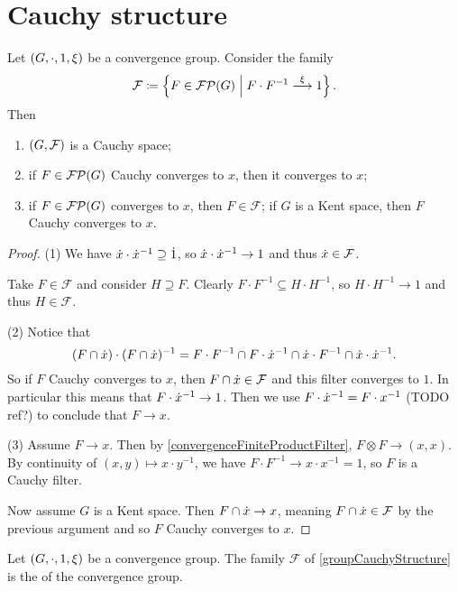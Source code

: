 \section{Cauchy structure}
\begin{proposition} \label{groupCauchyStructure}
Let $\left( G, \cdot, 1, \xi \right)$ be a convergence group. Consider the family
\[ \mathcal{F} \coloneqq \left\{ F\in \operatorname{\mathcal{FP}}(G) \;\middle|\; F\cdot F^{-1} \overset{\xi}{\longrightarrow} 1 \right\}. \]
Then
\begin{enumerate}
\item $\left( G, \mathcal{F} \right)$ is a Cauchy space;
\item if $F\in \operatorname{\mathcal{FP}}(G)$ Cauchy converges to $x$, then it converges to $x$;
\item if $F\in \operatorname{\mathcal{FP}}(G)$ converges to $x$, then $F\in \mathcal{F}$; if $G$ is a Kent space, then $F$ Cauchy converges to $x$.
\end{enumerate}
\end{proposition}
\begin{proof}
(1) We have $\dot{x}\cdot \dot{x}^{-1} \supseteq \dot{1}$, so $\dot{x}\cdot \dot{x}^{-1} \to 1$ and thus $\dot{x} \in \mathcal{F}$.

Take $F\in \mathcal{F}$ and consider $H\supseteq F$. Clearly $F\cdot F^{-1} \subseteq H\cdot H^{-1}$, so $H\cdot H^{-1} \to 1$ and thus $H\in \mathcal{F}$.

(2) Notice that
\[ (F\cap \dot{x})\cdot(F\cap \dot{x})^{-1} = F\cdot F^{-1} \cap F\cdot \dot{x}^{-1} \cap \dot{x}\cdot F^{-1} \cap \dot{x}\cdot\dot{x}^{-1}. \]
So if $F$ Cauchy converges to $x$, then $F\cap\dot{x} \in \mathcal{F}$ and this filter converges to $1$. In particular this means that $F\cdot\dot{x}^{-1} \to 1$. Then we use $F\cdot\dot{x}^{-1} = F\cdot x^{-1}$ (TODO ref?) to conclude that $F \to x$.

(3) Assume $F\to x$. Then by \ref{convergenceFiniteProductFilter}, $F\otimes F \to (x,x)$. By continuity of $(x,y)\mapsto x\cdot y^{-1}$, we have $F\cdot F^{-1}\to x\cdot x^{-1} = 1$, so $F$ is a Cauchy filter.

Now assume $G$ is a Kent space. Then $F\cap \dot{x} \to x$, meaning $F\cap \dot{x} \in \mathcal{F}$ by the previous argument and so $F$ Cauchy converges to $x$.
\end{proof}


\begin{definition}
Let $\left( G, \cdot, 1, \xi \right)$ be a convergence group. The family $\mathcal{F}$ of \ref{groupCauchyStructure} is the  of the convergence group.
\end{definition}

